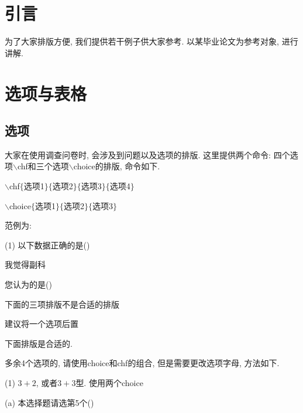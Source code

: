 \documentclass[a4paper,12pt,twoside]{ctexart}
\begin{document}
\newpage %
\pagestyle{empty}
\tableofcontents      %
\newpage %

\newpage


\section{引言}
    为了大家排版方便, 我们提供若干例子供大家参考. 以某毕业论文为参考对象, 进行讲解.

\section{选项与表格}
    \subsection{选项}

    大家在使用调查问卷时, 会涉及到问题以及选项的排版. 这里提供两个命令: 四个选项$\backslash$chf和三个选项$\backslash$choice的排版, 命令如下.

    $\backslash$chf$\{$选项1$\}\{$选项2$\}\{$选项3$\}\{$选项4$\}$

    $\backslash$choice$\{$选项1$\}\{$选项2$\}\{$选项3$\}$

    范例为:

    (1) 以下数据正确的是\hfill(\qquad)

    {我觉得副科}

    您认为的是\hfill(\qquad)

   \indent 下面的三项排版不是合适的排版

   建议将一个选项后置

   下面排版是合适的.



    多余4个选项的, 请使用choice和chf的组合, 但是需要更改选项字母, 方法如下.

    (1) $3+2$, 或者$3+3$型. 使用两个choice

    (a) 本选择题请选第5个\hfill (\quad)
\end{document}
